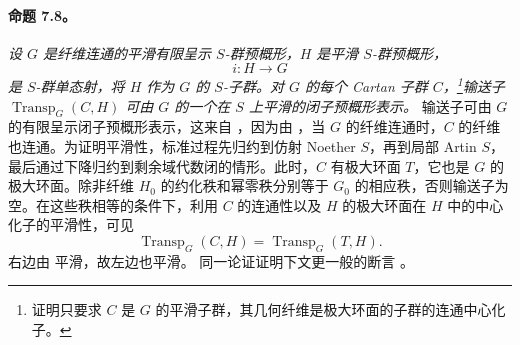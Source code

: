 \paragraph{\textbf{命题 7.8。}}
\emph{设 \(G\) 是纤维连通的平滑有限呈示 \(S\)-群预概形，\(H\) 是平滑 \(S\)-群预概形，}
\[
  i:H\longrightarrow G
\]
\emph{是 \(S\)-群单态射，将 \(H\) 作为 \(G\) 的 \(S\)-子群。对 \(G\) 的每个 Cartan 子群 \(C\)，\footnote{证明只要求 \(C\) 是 \(G\) 的平滑子群，其几何纤维是极大环面的子群的连通中心化子。}输送子 \(\operatorname{Transp}_G(C,H)\) 可由 \(G\) 的一个在 \(S\) 上平滑的闭子预概形表示。}
输送子可由 \(G\) 的有限呈示闭子预概形表示，这来自 ，因为由 ，当 \(G\) 的纤维连通时，\(C\) 的纤维也连通。为证明平滑性，标准过程先归约到仿射 Noether \(S\)，再到局部 Artin \(S\)，最后通过下降归约到剩余域代数闭的情形。此时，\(C\) 有极大环面 \(T\)，它也是 \(G\) 的极大环面。除非纤维 \(H_0\) 的约化秩和幂零秩分别等于 \(G_0\) 的相应秩，否则输送子为空。在这些秩相等的条件下，利用 \(C\) 的连通性以及 \(H\) 的极大环面在 \(H\) 中的中心化子的平滑性，可见
\[
  \operatorname{Transp}_G(C,H)
  =
  \operatorname{Transp}_G(T,H).
\]
右边由  平滑，故左边也平滑。
同一论证证明下文更一般的断言 。
